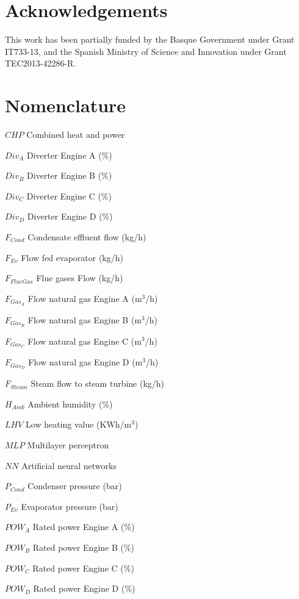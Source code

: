 \documentclass[preprint,12pt,authoryear]{elsarticle}
\begin{document}

\section{Acknowledgements}
This work has been partially funded by the Basque Government under Grant IT733-13, and the Spanish Ministry of Science and Innovation under Grant TEC2013-42286-R.


\section{Nomenclature}

\par $CHP$	Combined heat and power
\par $Div_A$	Diverter Engine A (\%)
\par $Div_B$	Diverter Engine B (\%)
\par $Div_C$	Diverter Engine C (\%)
\par $Div_D$	Diverter Engine D (\%)
\par $F_{Cond}$	Condensate effluent flow (kg/h) 
\par $F_{Ev}$	Flow fed evaporator (kg/h) 
\par $F_{FlueGas}$	Flue gases Flow (kg/h) 
\par $F_{Gas_A}$	Flow natural gas Engine A (m$^3$/h) 
\par $F_{Gas_B}$	Flow natural gas Engine B (m$^3$/h) 
\par $F_{Gas_C}$	Flow natural gas Engine C (m$^3$/h) 
\par $F_{Gas_D}$	Flow natural gas Engine D (m$^3$/h) 
\par $F_{Steam}$	Steam flow to steam turbine (kg/h)
\par $H_{Amb}$	Ambient humidity (\%)
\par $LHV$	Low heating value (KWh/m$^3$)
\par $MLP$ Multilayer perceptron
\par $NN$	Artificial neural networks 
\par $P_{Cond}$	Condenser pressure (bar)
\par $P_{Ev}$	Evaporator pressure (bar) 
\par $POW_A$	Rated power Engine A (\%) 
\par $POW_B$	Rated power Engine B (\%) 
\par $POW_C$	Rated power Engine C (\%) 
\par $POW_D$	Rated power Engine D (\%) 
\end{document}
